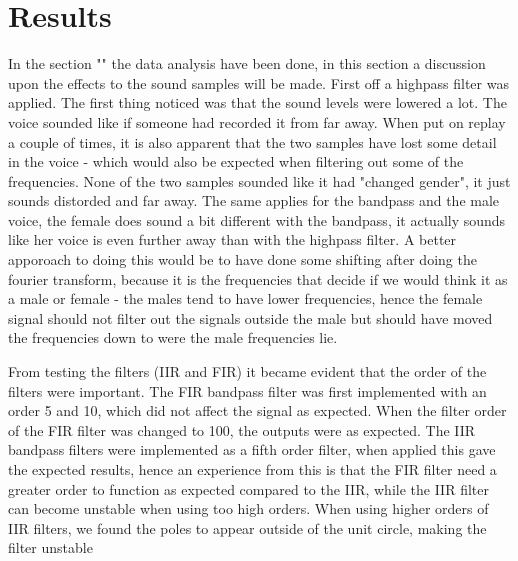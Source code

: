 
\section{Results}
In the section "" the data analysis have been done, in this section a discussion upon the effects to the sound samples will be made. First off a highpass filter was applied. The first thing noticed was that the sound levels were lowered a lot. The voice sounded like if someone had recorded it from far away. When put on replay a couple of times, it is also apparent that the two samples have lost some detail in the voice - which would also be expected when filtering out some of the frequencies. None of the two samples sounded like it had "changed gender", it just sounds distorded and far away. The same applies for the bandpass and the male voice, the female does sound a bit different with the bandpass, it actually sounds like her voice is even further away than with the highpass filter. A better apporoach to doing this would be to have done some shifting after doing the fourier transform, because it is the frequencies that decide if we would think it as a male or female - the males tend to have lower frequencies, hence the female signal should not filter out the signals outside the male but should have moved the frequencies down to were the male frequencies lie. 

From testing the filters (IIR and FIR) it became evident that the order of the filters were important. The FIR bandpass filter was first implemented with an order 5 and 10, which did not affect the signal as expected. When the filter order of the FIR filter was changed to 100, the outputs were as expected. The IIR bandpass filters were implemented as a fifth order filter, when applied this gave the expected results, hence an experience from this is that the FIR filter need a greater order to function as expected compared to the IIR, while the IIR filter can become unstable when using too high orders. When using higher orders of IIR filters, we found the poles to appear outside of the unit circle, making the filter unstable